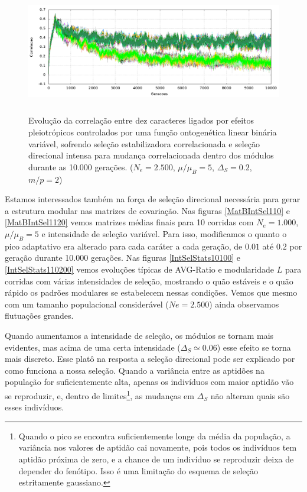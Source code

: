 \begin{figure}[htbp]
    \centering
    \includegraphics[width=150mm, height=55mm]{figuras/direcionalRMu5Ne2500IntSel200.png}
    \caption{Evolução da correlação entre dez caracteres ligados por efeitos
        pleiotrópicos controlados por uma função ontogenética linear binária
        variável, sofrendo seleção estabilizadora correlacionada
        e seleção direcional intensa para mudança correlacionada dentro dos
        módulos durante as 10.000 gerações. 
    ($N_e = 2.500$, $\mu/\mu_B=5$, $\Delta_S=0.2$, $m/p=2$)}
    \label{MatBDirecionalNe2500RMu5}
\end{figure}


Estamos interessados também na força de seleção direcional necessária
para gerar a estrutura modular nas matrizes de covariação. 
Nas figuras \ref{MatBIntSel110} e \ref{MatBIntSel1120} vemos matrizes
médias finais para 10 corridas com $N_e = 1.000$, $\mu/\mu_B=5$ e
intensidade de seleção variável. 
Para isso, modificamos o quanto o pico adaptativo era alterado para cada
caráter a cada geração, de $0.01$ até $0.2$ por geração durante 10.000
gerações. 
Nas figuras \ref{IntSelStats10100} e \ref{IntSelStats110200} vemos
evoluções típicas de AVG-Ratio e modularidade $L$ para corridas com
várias intensidades de seleção, mostrando o quão estáveis e o quão
rápido os padrões modulares se estabelecem nessas condições.
Vemos que mesmo com um tamanho populacional considerável ($Ne = 2.500$)
ainda observamos flutuações grandes. 

Quando aumentamos a intensidade de seleção, os módulos se tornam
mais evidentes, mas acima de uma certa intensidade ($\Delta_S \simeq 0.06$)
esse efeito se torna mais discreto. 
Esse platô na resposta a seleção direcional pode ser explicado por como
funciona a nossa seleção. 
Quando a variância entre as aptidões na população for suficientemente
alta, apenas os indivíduos com maior aptidão vão se reproduzir, e,
dentro de limites\footnote{ Quando o pico se encontra suficientemente
    longe da média da população, a variância nos valores de aptidão cai
    novamente, pois todos os indivíduos tem aptidão próxima de zero, e a
    chance de um indivíduo se reproduzir deixa de depender do fenótipo. 
Isso é uma limitação do esquema de seleção estritamente gaussiano.}, as
mudanças em $\Delta_S$ não alteram quais são esses indivíduos. 


